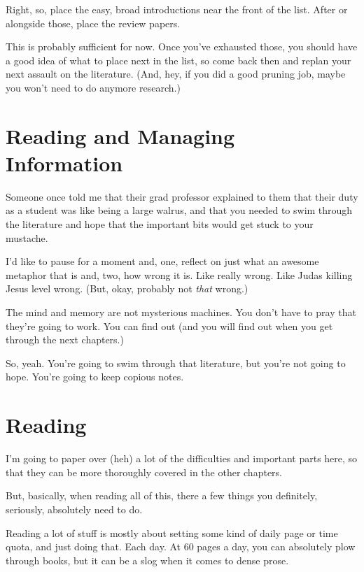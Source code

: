 
Right, so, place the easy, broad introductions near the front of the list. After
or alongside those, place the review papers.

This is probably sufficient for now. Once you've exhausted those, you should
have a good idea of what to place next in the list, so come back then and replan
your next assault on the literature. (And, hey, if you did a good pruning job,
maybe you won't need to do anymore research.)

\section{Reading and Managing Information}

Someone once told me that their grad professor explained to them that their
duty as a student was like being a large walrus, and that you needed to swim
through the literature and hope that the important bits would get stuck to your
mustache.

I'd like to pause for a moment and, one, reflect on just what an awesome
metaphor that is and, two, how wrong it is. Like really wrong. Like Judas
killing Jesus level wrong. (But, okay, probably not \textit{that} wrong.)

The mind and memory
are not mysterious machines. You don't have to pray that they're going to
work. You can find out (and you will find out when you get through the next chapters.)

So, yeah. You're going to swim through that literature, but you're not going to
hope. You're going to keep copious notes.

\section{Reading}

I'm going to paper over (heh) a lot of the difficulties and important parts
here, so that they can be more thoroughly covered in the other chapters.

But, basically, when reading all of this, there a few things you definitely,
seriously, absolutely need to do.

Reading a lot of stuff is mostly about setting some kind of daily page or time
quota, and just doing that. Each day. At 60 pages a day, you can absolutely plow
through books, but it can be a slog when it comes to dense prose.

